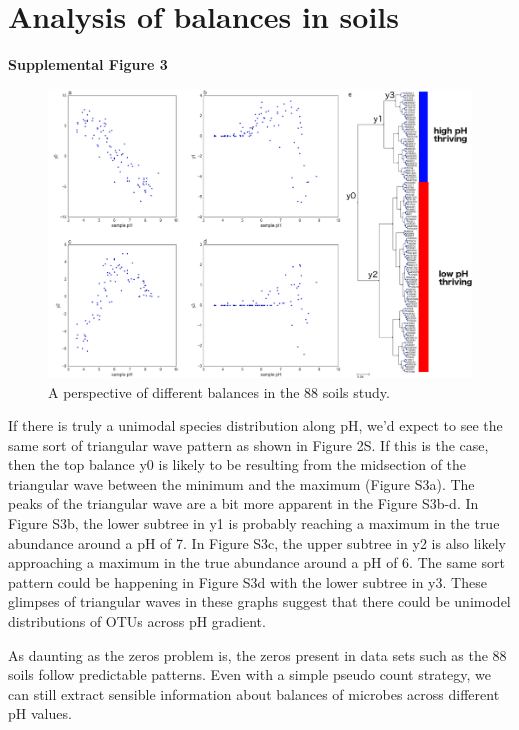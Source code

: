 \section{Analysis of balances in soils}
\textbf{Supplemental Figure 3}

\begin{figure}[H]
        \centering
        \includegraphics[width=1\textwidth]{appendix_b/sup_figure3.png}
        \caption[Other balances from the 88 soils study.]{A perspective of different balances in the 88 soils study.}
        \label{figbS3}
\end{figure}

If there is truly a unimodal species distribution along pH, we’d expect to see the same sort of triangular wave pattern as shown in Figure 2S.  If this is the case, then the top balance y0 is likely to be resulting from the midsection of the triangular wave between the minimum and the maximum (Figure S3a).  The peaks of the triangular wave are a bit more apparent in the Figure S3b-d.  In Figure S3b, the lower subtree in y1 is probably reaching a maximum in the true abundance around a pH of 7.  In Figure S3c, the upper subtree in y2 is also likely approaching a maximum in the true abundance around a pH of 6.  The same sort pattern could be happening in Figure S3d with the lower subtree in y3.  These glimpses of triangular waves in these graphs suggest that there could be unimodel distributions of OTUs across pH gradient.

As daunting as the zeros problem is, the zeros present in data sets such as the 88 soils follow predictable patterns.  Even with a simple pseudo count strategy, we can still extract sensible information about balances of microbes across different pH values.
